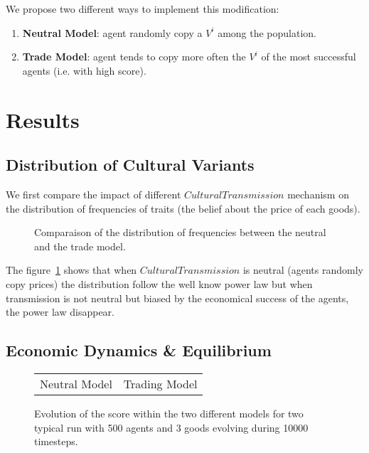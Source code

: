 \documentclass{article}
\newcommand{\compresslist}{
	\setlength{\itemsep}{1pt}
	\setlength{\parskip}{0pt}
	\setlength{\parsep}{0pt}
}
\begin{document}
We propose two different ways to implement this modification: 
\vspace{-.15cm}
\begin{enumerate}
		\compresslist
	\item \textbf{Neutral Model}: agent randomly copy a $V^i$ among the population.
	\item \textbf{Trade Model}: agent tends to copy more often the $V^i$ of the most successful agents (i.e. with high score).
\end{enumerate}


\section{Results}
\subsection*{Distribution of Cultural Variants}
We first compare the impact of different $CulturalTransmission$ mechanism on the distribution of frequencies of traits (the belief about the price of each goods). 
\begin{figure}[H]
	\centering
		\caption{Comparaison of the distribution of frequencies between the neutral and the trade model.}
		\label{fig:2setDi}
\end{figure}
The figure~\ref{fig:2setDi} shows that when $CulturalTransmission$ is neutral (agents randomly copy prices) the distribution follow the well know power law \cite{bentley_random_2004} but when transmission is not neutral but biased by the economical success of the agents, the power law disappear.

\subsection*{Economic Dynamics \& Equilibrium}



\begin{figure}[H]
	\centering
	\begin{tabular}{ c c}
		 Neutral Model & Trading Model \\

	\end{tabular}
	\caption{Evolution of the score within the two different models for two typical run with 500 agents and 3 goods evolving during 10000 timesteps.}%
	\label{fig:scoreEvol}
\end{figure}
\end{document}
